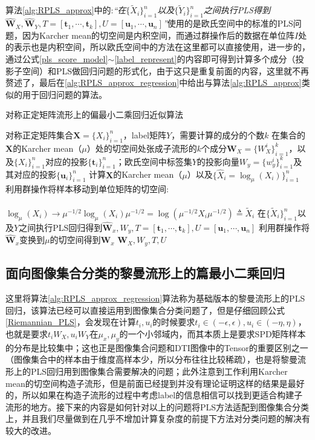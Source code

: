 算法\ref{alg:RPLS_approx}中的:\textit{“在$\{\tilde{X}_{i}\}_{i=1}^{n}$以及$\{\tilde{Y}_{i}\}_{i=1}^{n}$之间执行PLS得到$\hat{\bm{W}}_X,\hat{\bm{W}}_Y,T=[\bm{t}_1,\cdots,\bm{t}_k],U=[\bm{u}_1,\cdots,\bm{u}_n]$”}使用的是欧氏空间中的标准的PLS问题，因为Karcher mean的切空间是内积空间，而通过群操作后的数据在单位阵$I$处的表示也是内积空间，所以欧氏空间中的方法在这里都可以直接使用，进一步的，通过公式\ref{pls_score_model}$\sim$\ref{label_represent}的内容即可得到计算多个成分（投影子空间）和PLS做回归问题的形式化，由于这只是重复前面的内容，这里就不再赘述了，最后在\ref{alg:RPLS_approx_regression}中给出与算法\ref{alg:RPLS_approx}类似的用于回归问题的算法。
\begin{algorithm}[hbt]
\caption{对称正定矩阵流形上的偏最小二乘回归近似算法}
\label{alg:RPLS_approx_regression}
\begin{algorithmic}[1]
\REQUIRE 对称正定矩阵集合$\bm{X}=\{X_i\}_{i=1}^{n}$，label矩阵$Y$，需要计算的成分的个数$k$
\ENSURE 在集合的$\bm{X}$的Karcher mean（$\mu$）处的切空间处张成子流形的$k$个成分$\bm{W}_{X}=\{W_{X}^{i}\}_{i=1}^{k}$，以及$\{X_i\}_{i=1}^{n}$对应的投影$\{\bm{t}_i\}_{i=1}^{n}$；欧氏空间中标签集$Y$的投影向量$W_y=\{w_{y}^{i}\}_{i=1}^{k}$及其对应的投影$\{\bm{u}_i\}_{i=1}^{n}$
\STATE 计算$\bm{X}$的Karcher mean（$\mu$）以及$\{\hat{X}_i=\log_{\mu}(X_i)\}_{i=1}^{n}$
\STATE 利用群操作将样本移动到单位矩阵的切空间:\\
 ~~~~~~~~~~~~~~~~~~~~$\log_{\mu}(X_i)\rightarrow \mu^{-1/2}\log_{\mu}(X_i)\mu^{-1/2}=\log(\mu^{-1/2}X_i\mu^{-1/2})\triangleq \tilde{X}_i$
\STATE 在$\{\tilde{X}_{i}\}_{i=1}^{n}$以及$Y$之间执行PLS回归得到$\hat{\bm{W}}_x,W_y,T=[\bm{t}_1,\cdots,\bm{t}_k],U=[\bm{u}_1,\cdots,\bm{u}_n]$
\STATE 利用群操作将$\hat{\bm{W}}_x$变换到$\mu$的切空间得到$\bm{W}_x$
\RETURN $\bm{W}_X,W_y,T,U$
\end{algorithmic}
\end{algorithm}
\subsection{面向图像集合分类的黎曼流形上的篇最小二乘回归}
\label{sec:ImageSet_PLS}
这里将算法\ref{alg:RPLS_approx_regression}算法称为基础版本的黎曼流形上的PLS回归，该算法已经可以直接运用到图像集合分类问题了，但是仔细回顾公式\ref{Riemannian_PLS}，会发现在计算$t_i,u_i$的时候要求$t_i \in (-\epsilon,\epsilon),u_i \in (-\eta,\eta)$，也就是要求$t_iW_X,u_iW_Y$在$\mu_x,\mu_y$的一个小邻域内，而其本质上是要求SPD矩阵样本的分布是比较集中；这也正是图像集合问题和DTI图像中的Tensor的重要区别之一（图像集合中的样本由于维度高样本少，所以分布往往比较稀疏），也是将黎曼流形上的PLS回归用到图像集合需要解决的问题；此外注意到工作\cite{RCCA,PGA}利用Karcher mean的切空间构造子流形，但是前面已经提到并没有理论证明这样的结果是最好的，所以如果在构造子流形的过程中考虑label的信息相信可以找到更适合构建子流形的地方。接下来的内容是如何针对以上的问题将PLS方法适配到图像集合分类上，并且我们尽量做到在几乎不增加计算复杂度的前提下方法对分类问题的解决有较大的改进。
